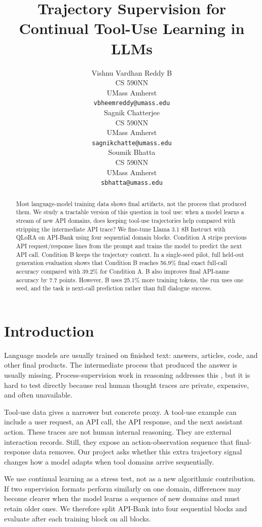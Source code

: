 \documentclass{article}
\title{Trajectory Supervision for Continual Tool-Use Learning in LLMs}
\author{%
  Vishnu Vardhan Reddy B \\
  CS 590NN \\
  UMass Amherst \\
  \texttt{vbheemreddy@umass.edu} \\
  \And
  Sagnik Chatterjee \\
  CS 590NN \\
  UMass Amherst \\
  \texttt{sagnikchatte@umass.edu} \\
  \And
  Soumik Bhatta \\
  CS 590NN \\
  UMass Amherst \\
  \texttt{sbhatta@umass.edu} \\
}
\begin{document}
\maketitle

\begin{abstract}
Most language-model training data shows final artifacts, not the process that produced them. We study a tractable version of this question in tool use: when a model learns a stream of new API domains, does keeping tool-use trajectories help compared with stripping the intermediate API trace? We fine-tune Llama 3.1 8B Instruct with QLoRA on API-Bank using four sequential domain blocks. Condition A strips previous API request/response lines from the prompt and trains the model to predict the next API call. Condition B keeps the trajectory context. In a single-seed pilot, full held-out generation evaluation shows that Condition B reaches 56.9\% final exact full-call accuracy compared with 39.2\% for Condition A. B also improves final API-name accuracy by 7.7 points. However, B uses 25.1\% more training tokens, the run uses one seed, and the task is next-call prediction rather than full dialogue success.
\end{abstract}

\section{Introduction}

Language models are usually trained on finished text: answers, articles, code, and other final products. The intermediate process that produced the answer is usually missing. Process-supervision work in reasoning addresses this \citep{lightman2023verify}, but it is hard to test directly because real human thought traces are private, expensive, and often unavailable.

Tool-use data gives a narrower but concrete proxy. A tool-use example can include a user request, an API call, the API response, and the next assistant action. These traces are not human internal reasoning. They are external interaction records. Still, they expose an action-observation sequence that final-response data removes. Our project asks whether this extra trajectory signal changes how a model adapts when tool domains arrive sequentially.

We use continual learning as a stress test, not as a new algorithmic contribution. If two supervision formats perform similarly on one domain, differences may become clearer when the model learns a sequence of new domains and must retain older ones. We therefore split API-Bank \citep{li2023apibank} into four sequential blocks and evaluate after each training block on all blocks.
\end{document}
